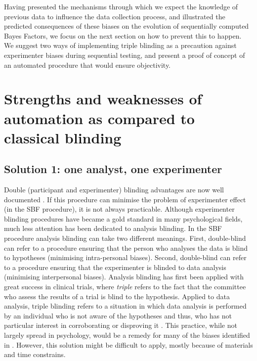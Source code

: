 \documentclass[a4paper,man,natbib,floatsintext,donotrepeattitle]{apa6}
\begin{document}
Having presented the mechanisms through which we expect the knowledge of previous data to influence the data collection process, and illustrated the predicted consequences of these biases on the evolution of sequentially computed Bayes Factors, we focus on the next section on how to prevent this to happen. We suggest two ways of implementing triple blinding as a precaution against experimenter biases during sequential testing, and present a proof of concept of an automated procedure that would ensure objectivity.

\section{Strengths and weaknesses of automation as compared to classical blinding}

\subsection{Solution 1: one analyst, one experimenter}


Double (participant and experimenter) blinding advantages are now well documented \citep{schulz_blinding_2002}. If this procedure can minimise the problem of experimenter effect (in the SBF procedure), it is not always practicable. Although experimenter blinding procedures have became a gold standard in many psychological fields, much less attention has been dedicated to analysis blinding. In the SBF procedure analysis blinding can take two different meanings. First, double-blind can refer to a procedure ensuring that the person who analyses the data is blind to hypotheses (minimising intra-personal biases). Second, double-blind can refer to a procedure ensuring that the experimenter is blinded to data analysis (minimising interpersonal biases). Analysis blinding has first been applied with great success in clinical trials, where \textit{triple} refers to the fact that the committee who assess the results of a trial is blind to the hypothesis. Applied to data analysis, triple blinding refers to a situation in which data analysis is performed by an individual who is not aware of the hypotheses and thus, who has not particular interest in corroborating or disproving it \citep{miller_blind_2011}. This practice, while not largely spread in psychology, would be a remedy for many of the biases identified in \cite{wicherts_degrees_2016}. However, this solution might be difficult to apply, mostly because of materials and time constrains.
\end{document}
